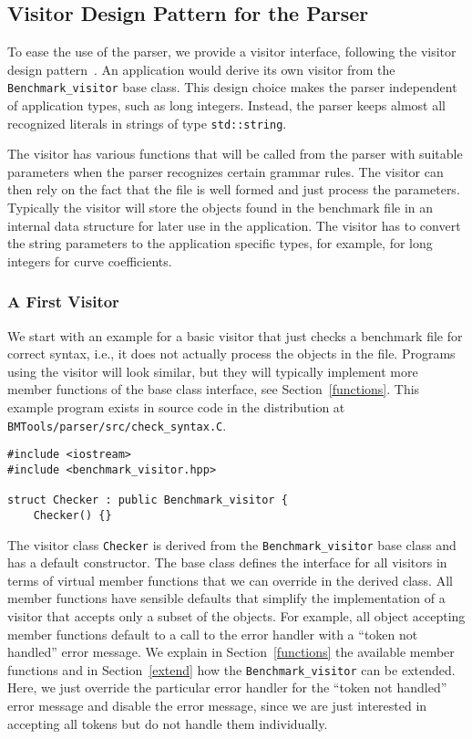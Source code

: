 \subsection{Visitor Design Pattern for the Parser\label{visitor}}

To ease the use of the parser, we provide a visitor interface,
following the visitor design pattern~\cite{cgal:ghjv-dpero-95}.  An
application would derive its own visitor from the
\texttt{Benchmark\_visitor} base class. This design choice makes the
parser independent of application types, such as long integers.
Instead, the parser keeps almost all recognized literals in strings of
type \texttt{std::string}.

The visitor has various functions that will be called from the parser
with suitable parameters when the parser recognizes certain grammar
rules. The visitor can then rely on the fact that the file is well
formed and just process the parameters. Typically the visitor will
store the objects found in the benchmark file in an internal data
structure for later use in the application. The visitor has to convert
the string parameters to the application specific types, for example,
for long integers for curve coefficients. 

\subsubsection{A First Visitor\label{checker}}

We start with an example for a basic visitor that just checks a
benchmark file for correct syntax, i.e., it does not actually process
the objects in the file. Programs using the visitor will look similar,
but they will typically implement more member functions of the base
class interface, see Section~\ref{functions}. This example program
exists in source code in the distribution at
\verb|BMTools/parser/src/check_syntax.C|. 

\begin{verbatim}
#include <iostream>
#include <benchmark_visitor.hpp>

struct Checker : public Benchmark_visitor {
    Checker() {}
\end{verbatim}

\noindent
The visitor class \texttt{Checker} is derived from the
\texttt{Benchmark\_visitor} base class and has a default constructor.
The base class defines the interface for all visitors in terms of
virtual member functions that we can override in the derived class.
All member functions have sensible defaults that simplify the
implementation of a visitor that accepts only a subset of the objects.
For example, all object accepting member functions default to a call
to the error handler with a ``token not handled'' error message. We
explain in Section~\ref{functions} the available member functions and
in Section~\ref{extend} how the \texttt{Benchmark\_visitor} can be
extended. Here, we just override the particular error handler for 
the ``token not handled'' error message and disable the error message,
since we are just interested in accepting all tokens but do not handle
them individually.

